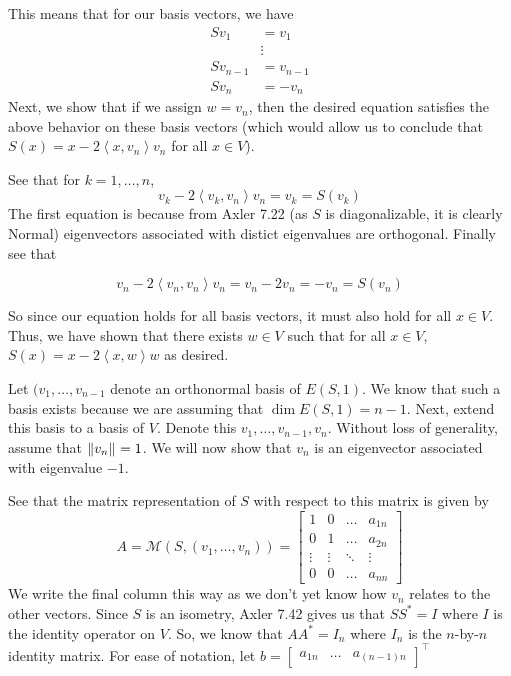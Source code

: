 \documentclass[answers]{exam}
\newcommand{\ip}[1]{\left\langle#1\right\rangle}
\newcommand{\M}[1]{\mathcal{M}\left(#1\right)}
\begin{document}
\begin{questions}
\begin{parts}
\begin{solution}
            This means that for our basis vectors, we have
            \begin{align*}
                Sv_1 &= v_1 \\
                     &\vdots\\
                Sv_{n-1}&= v_{n-1}\\
                Sv_n &= -v_n
            \end{align*}
            Next, we show that if we assign $w=v_n$, then the desired equation satisfies the above behavior on 
            these basis vectors (which would allow us to conclude that $S(x) = x - 2\ip{x,v_n}v_n$ for all
            $x\in V$).


            See that for $k=1,\dots,n$, 
            \[
                v_k - 2\ip{v_k,v_n}v_n = v_k = S(v_k)
            \]
            The first equation is because from Axler 7.22 (as $S$ is diagonalizable, it is clearly Normal) 
            eigenvectors associated with distict eigenvalues are orthogonal. Finally see that

            \[
                v_n - 2\ip{v_n,v_n}v_n = v_n - 2v_n = -v_n = S(v_n)
            \]

            So since our equation holds for all basis vectors, it must also hold for all $x\in V$. Thus, we have
            shown that there exists $w\in V$ such that for all $x\in V$, $S(x) = x - 2\ip{x,w}w$ as desired.
            

            Let $(v_1,\dots,v_{n-1}$ denote an orthonormal basis of $E(S,1)$. We know that such a basis exists
            because we are assuming that $\dim E(S,1) = n-1$. Next, extend this basis to a basis of $V$. Denote
            this $v_1,\dots,v_{n-1},v_n$. Without loss of generality, assume that $\left\|v_n\right\|_{} = 1$. We will
            now show that $v_n$ is an eigenvector associated with eigenvalue $-1$.

            See that the matrix representation of $S$ with respect to this matrix is given by
            \[
                A = \M{S,(v_1,\dots,v_n)} = \begin{bmatrix}
                    1 & 0 & \dots & a_{1n} \\
                    0 & 1 & \dots & a_{2n} \\
                    \vdots &\vdots&\ddots & \vdots \\
                    0 & 0 & \dots & a_{nn}
                \end{bmatrix}
            \]
            We write the final column this way as we don't yet know how $v_n$ relates to the other vectors.
            Since $S$ is an isometry, Axler 7.42 gives us that $SS^* = I$ where $I$ is the 
            identity operator on $V$. So, we know that $AA^* = I_n$ where $I_n$ is the $n$-by-$n$ identity matrix.
            For ease of notation, let $b = \begin{bmatrix}a_{1n}&\dots&a_{(n-1)n}\end{bmatrix}^\top$


\end{solution}
\end{parts}
\end{questions}
\end{document}
